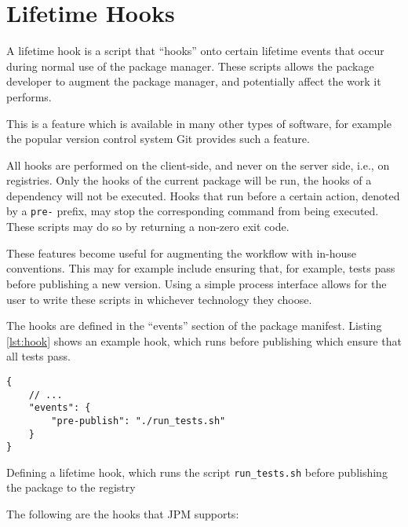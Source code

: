 \section{Lifetime Hooks}
\label{sec:lifetime_hooks}

A lifetime hook is a script that ``hooks'' onto certain lifetime events that
occur during normal use of the package manager. These scripts allows the
package developer to augment the package manager, and potentially affect the
work it performs.

This is a feature which is available in many other types of software, for
example the popular version control system Git provides such a
feature\autocite{chacon2009pro}.

All hooks are performed on the client-side, and never on the server side, i.e.,
on registries. Only the hooks of the current package will be run, the
hooks of a dependency will not be executed. Hooks that run before a certain
action, denoted by a \verb!pre-! prefix, may stop the corresponding command
from being executed.  These scripts may do so by returning a non-zero exit
code.

These features become useful for augmenting the workflow with in-house
conventions. This may for example include ensuring that, for example, tests
pass before publishing a new version. Using a simple process interface allows
for the user to write these scripts in whichever technology they choose.

The hooks are defined in the ``events'' section of the package manifest.
Listing \ref{lst:hook} shows an example hook, which runs before publishing
which ensure that all tests pass.

\begin{listing}[H]
\begin{verbatim}
{
    // ...
    "events": {
        "pre-publish": "./run_tests.sh"
    }
}
\end{verbatim}

\caption{Defining a lifetime hook, which runs the script
    \texttt{run_tests.sh} before publishing the package to the
        registry}

\label{lst:hook}

\end{listing}

The following are the hooks that JPM supports:

